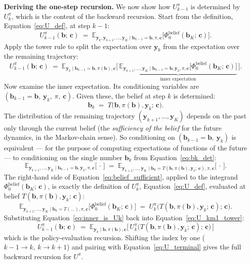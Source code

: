 \documentclass[11pt]{article}
\newcommand{\bc}{\bm{c}}
\newcommand{\by}{\bm{y}}
\newcommand{\bb}{\bm{b}}
\newcommand{\E}{\mathbb{E}}
\begin{document}
\textbf{Deriving the one-step recursion.}  We now show how $U^\pi_{k-1}$ is determined by $U^\pi_k$, which is the content of the backward recursion.  Start from the definition, Equation~\eqref{eq:U_def}, at step $k - 1$:
\begin{equation}
U^\pi_{k-1}(\bb;\, \bc) \;=\; \E_{\by_k, \by_{k+1}, \ldots, \by_K \mid \bb_{k-1} = \bb, \pi, \bc}\!\bigl[\Phi_0^{\mathrm{belief}}(\bb_K;\, \bc)\bigr].
\label{eq:U_km1}
\end{equation}
Apply the tower rule to split the expectation over $\by_k$ from the expectation over the remaining trajectory:
\begin{equation}
U^\pi_{k-1}(\bb;\, \bc) \;=\; \E_{\by_k \mid \bb_{k-1} = \bb, \pi(\bb), \bc}\!\Biggl[\,\underbrace{\E_{\by_{k+1}, \ldots, \by_K \mid \bb_{k-1} = \bb, \by_k, \pi, \bc}\!\bigl[\Phi_0^{\mathrm{belief}}(\bb_K;\, \bc)\bigr]}_{\text{inner expectation}}\,\Biggr].
\label{eq:U_km1_tower}
\end{equation}
Now examine the inner expectation.  Its conditioning variables are $(\bb_{k-1} = \bb,\ \by_k,\ \pi,\ \bc)$.  Given these, the belief at step $k$ is determined:
\begin{equation}
\bb_k \;=\; T\bigl(\bb, \pi(\bb), \by_k;\, \bc\bigr).
\label{eq:bk_det}
\end{equation}
The distribution of the remaining trajectory $(\by_{k+1}, \ldots, \by_K)$ depends on the past only through the current belief (the \emph{sufficiency of the belief} for the future dynamics, in the Markov-chain sense).  So conditioning on $(\bb_{k-1} = \bb,\ \by_k)$ is equivalent --- for the purpose of computing expectations of functions of the future --- to conditioning on the single number $\bb_k$ from Equation~\eqref{eq:bk_det}:
\begin{equation}
\E_{\by_{k+1}, \ldots, \by_K \mid \bb_{k-1} = \bb, \by_k, \pi, \bc}\!\bigl[\,\cdot\,\bigr]
\;=\;
\E_{\by_{k+1}, \ldots, \by_K \mid \bb_k = T(\bb, \pi(\bb), \by_k;\, \bc), \pi, \bc}\!\bigl[\,\cdot\,\bigr].
\label{eq:belief_sufficient}
\end{equation}
The right-hand side of Equation~\eqref{eq:belief_sufficient}, applied to the integrand $\Phi_0^{\mathrm{belief}}(\bb_K;\, \bc)$, is exactly the definition of $U^\pi_k$, Equation~\eqref{eq:U_def}, evaluated at belief $T(\bb, \pi(\bb), \by_k;\, \bc)$:
\begin{equation}
\E_{\by_{k+1}, \ldots, \by_K \mid \bb_k = T(\ldots), \pi, \bc}\!\bigl[\Phi_0^{\mathrm{belief}}(\bb_K;\, \bc)\bigr]
\;=\; U^\pi_k\bigl(T(\bb, \pi(\bb), \by_k;\, \bc);\, \bc\bigr).
\label{eq:inner_is_Uk}
\end{equation}
Substituting Equation~\eqref{eq:inner_is_Uk} back into Equation~\eqref{eq:U_km1_tower}:
\begin{equation}
\boxed{\ U^\pi_{k-1}(\bb;\, \bc) \;=\; \E_{\by_k \mid \bb, \pi(\bb), \bc}\!\bigl[\,U^\pi_k\bigl(T(\bb, \pi(\bb), \by_k;\, \bc);\, \bc\bigr)\,\bigr]\ }
\label{eq:U_recursion}
\end{equation}
which is the policy-evaluation recursion.  Shifting the index by one ($k - 1 \to k,\ k \to k + 1$) and pairing with Equation~\eqref{eq:U_terminal} gives the full backward recursion for $U^\pi$.
\end{document}
